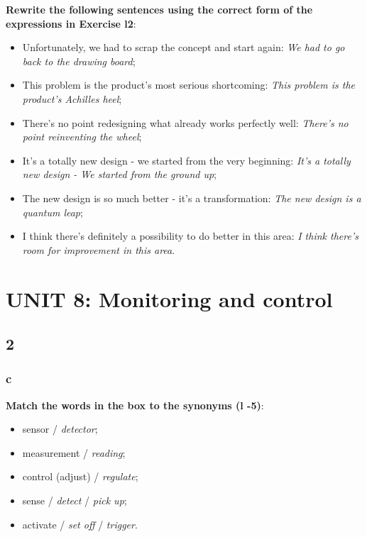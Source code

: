 \textbf{Rewrite the following sentences using the correct form of the expressions in Exercise l2}:

\begin{itemize}

\item Unfortunately, we had to scrap the concept and start again: \textit{We had to go back to the drawing board};
\item This problem is the product's most serious shortcoming: \textit{This problem is the product's Achilles heel};
\item There's no point redesigning what already works perfectly well: \textit{There's no point reinventing the wheel};
\item It's a totally new design - we started from the very beginning: \textit{It's a totally new design - We started from the ground up};
\item The new design is so much better - it's a transformation: \textit{The new design is a quantum leap};
\item I think there's definitely a possibility to do better in this area: \textit{I think there's room for improvement in this area}.

\end{itemize}


\section{UNIT 8: Monitoring and control}

\subsection{2}

\subsubsection{c}

\textbf{Match the words in the box to the synonyms (l -5)}:

\begin{itemize}

\item sensor / \textit{detector};
\item measurement / \textit{reading};
\item control (adjust) / \textit{regulate};
\item sense / \textit{detect} / \textit{pick up};
\item activate / \textit{set off} / \textit{trigger}.

\end{itemize}

